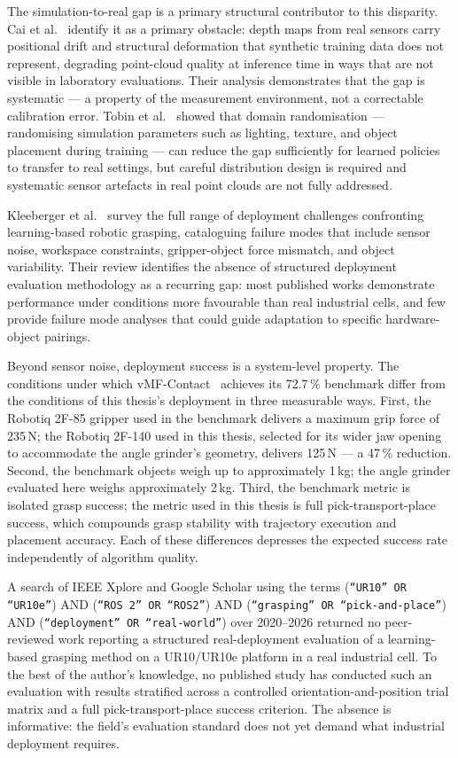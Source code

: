 \documentclass[12pt, a4paper]{report}
\begin{document}
The simulation-to-real gap is a primary structural contributor to this disparity. Cai et al.~\cite{cai2024} identify it as a primary obstacle: depth maps from real sensors carry positional drift and structural deformation that synthetic training data does not represent, degrading point-cloud quality at inference time in ways that are not visible in laboratory evaluations. Their analysis demonstrates that the gap is systematic --- a property of the measurement environment, not a correctable calibration error. Tobin et al.~\cite{tobin2017domain} showed that domain randomisation --- randomising simulation parameters such as lighting, texture, and object placement during training --- can reduce the gap sufficiently for learned policies to transfer to real settings, but careful distribution design is required and systematic sensor artefacts in real point clouds are not fully addressed.

Kleeberger et al.~\cite{kleeberger2020survey} survey the full range of deployment challenges confronting learning-based robotic grasping, cataloguing failure modes that include sensor noise, workspace constraints, gripper-object force mismatch, and object variability. Their review identifies the absence of structured deployment evaluation methodology as a recurring gap: most published works demonstrate performance under conditions more favourable than real industrial cells, and few provide failure mode analyses that could guide adaptation to specific hardware-object pairings.

Beyond sensor noise, deployment success is a system-level property. The conditions under which vMF-Contact~\cite{shi2025} achieves its 72.7\,\% benchmark differ from the conditions of this thesis's deployment in three measurable ways. First, the Robotiq 2F-85 gripper used in the benchmark delivers a maximum grip force of 235\,N; the Robotiq 2F-140 used in this thesis, selected for its wider jaw opening to accommodate the angle grinder's geometry, delivers 125\,N --- a 47\,\% reduction. Second, the benchmark objects weigh up to approximately 1\,kg; the angle grinder evaluated here weighs approximately 2\,kg. Third, the benchmark metric is isolated grasp success; the metric used in this thesis is full pick-transport-place success, which compounds grasp stability with trajectory execution and placement accuracy. Each of these differences depresses the expected success rate independently of algorithm quality.

A search of IEEE Xplore and Google Scholar using the terms (\texttt{``UR10'' OR ``UR10e''}) AND (\texttt{``ROS~2'' OR ``ROS2''}) AND (\texttt{``grasping'' OR ``pick-and-place''}) AND (\texttt{``deployment'' OR ``real-world''}) over 2020--2026 returned no peer-reviewed work reporting a structured real-deployment evaluation of a learning-based grasping method on a UR10/UR10e platform in a real industrial cell. To the best of the author's knowledge, no published study has conducted such an evaluation with results stratified across a controlled orientation-and-position trial matrix and a full pick-transport-place success criterion. The absence is informative: the field's evaluation standard does not yet demand what industrial deployment requires.
\end{document}

